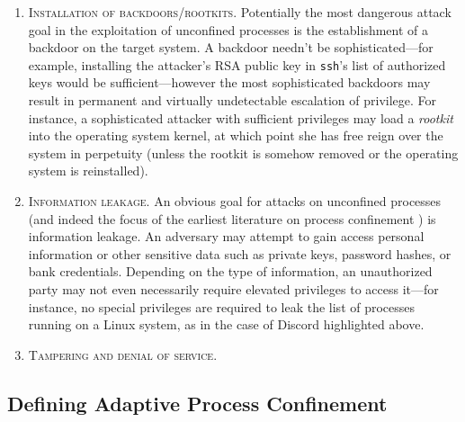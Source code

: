 \documentclass[dvipsnames, 12pt]{article}
\begin{document}
\begin{enumerate}[label=\bfseries G\arabic*., ref=G\arabic*, labelindent=2em]
    \item \label{g:1} \textsc{Installation of backdoors/rootkits.} Potentially
    the most dangerous attack goal in the exploitation of unconfined processes
    is the establishment of a backdoor on the target system.  A backdoor needn't
    be sophisticated---for example, installing the attacker's RSA public key in
    \texttt{ssh}'s list of authorized keys would be sufficient---however the
    most sophisticated backdoors may result in permanent and virtually
    undetectable escalation of privilege. For instance, a sophisticated attacker
    with sufficient privileges may load a \textit{rootkit}
    \cite{beegle2007_rootkit} into the operating system kernel, at which point
    she has free reign over the system in perpetuity (unless the rootkit is
    somehow removed or the operating system is reinstalled).

    \item \label{g:2} \textsc{Information leakage.} An obvious goal for attacks
    on unconfined processes (and indeed the focus of the earliest literature on
    process confinement \cite{lampson1973_a_note}) is information leakage. An
    adversary may attempt to gain access personal information or other sensitive
    data such as private keys, password hashes, or bank credentials. Depending
    on the type of information, an unauthorized party may not even necessarily
    require elevated privileges to access it---for instance, no special
    privileges are required to leak the list of processes running on a Linux
    system, as in the case of Discord \cite{discord} highlighted above.

    \item \label{g:3} \textsc{Tampering and denial of service.} 
\end{enumerate}


\subsection{Defining Adaptive Process Confinement}
\end{document}
